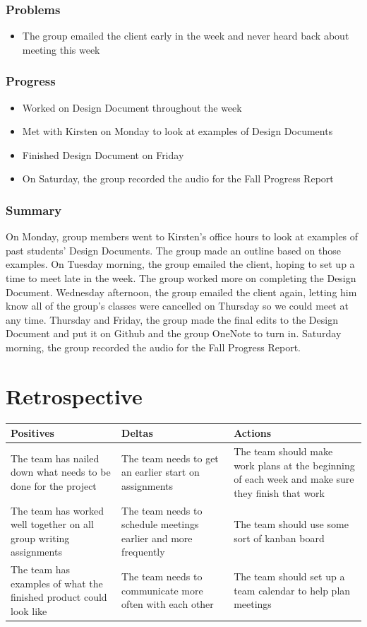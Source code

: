 \documentclass[onecolumn, draftclsnofoot,10pt, compsoc]{IEEEtran}
\begin{document}
\subsubsection{Problems}
\begin{itemize}
\item The group emailed the client early in the week and never heard back about meeting this week 
\end{itemize}
\subsubsection{Progress}
\begin{itemize}
\item Worked on Design Document throughout the week
\item Met with Kirsten on Monday to look at examples of Design Documents
\item Finished Design Document on Friday
\item On Saturday, the group recorded the audio for the Fall Progress Report
\end{itemize}
\subsubsection{Summary}
On Monday, group members went to Kirsten's office hours to look at examples of past students' Design Documents. The group made an outline based on those examples. On Tuesday morning, the group emailed the client, hoping to set up a time to meet late in the week. The group worked more on completing the Design Document. Wednesday afternoon, the group emailed the client again, letting him know all of the group's classes were cancelled on Thursday so we could meet at any time. Thursday and Friday, the group made the final edits to the Design Document and put it on Github and the group OneNote to turn in. Saturday morning, the group recorded the audio for the Fall Progress Report. 

\section{Retrospective}
\begin{table}[h!]
\centering
\begin{tabular}{ |p{.3\linewidth}|p{.3\linewidth}|p{.3\linewidth}| } 
\hline
\textbf{Positives} & \textbf{Deltas} & \textbf{Actions} \\ \hline
The team has nailed down what needs to be done for the project & The team needs to get an earlier start on assignments & The team should make work plans at the beginning of each week and make sure they finish that work  \\ \hline
The team has worked well together on all group writing assignments & The team needs to schedule meetings earlier and more frequently & The team should use some sort of kanban board \\ \hline
The team has examples of what the finished product could look like & The team needs to communicate more often with each other & The team should set up a team calendar to help plan meetings \\ \hline
\end{tabular}
\end{table}
\end{document}
